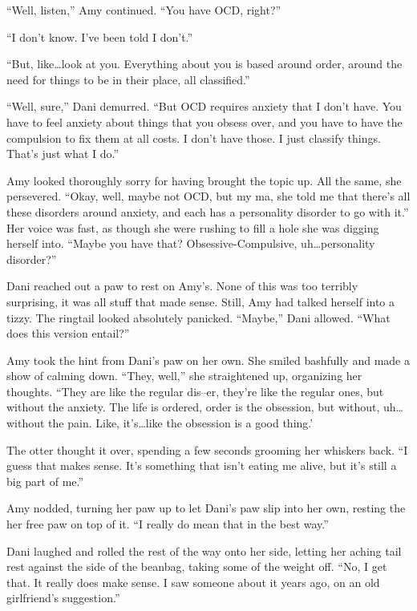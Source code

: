 ``Well, listen,'' Amy continued. ``You have OCD, right?''

``I don't know. I've been told I don't.''

``But, like\ldots{}look at you. Everything about you is based around order, around the need for things to be in their place, all classified.''

``Well, sure,'' Dani demurred. ``But OCD requires anxiety that I don't have. You have to feel anxiety about things that you obsess over, and you have to have the compulsion to fix them at all costs. I don't have those. I just classify things. That's just what I do.''\newpage

Amy looked thoroughly sorry for having brought the topic up. All the same, she persevered. ``Okay, well, maybe not OCD, but my ma, she told me that there's all these disorders around anxiety, and each has a personality disorder to go with it.'' Her voice was fast, as though she were rushing to fill a hole she was digging herself into. ``Maybe you have that? Obsessive-Compulsive, uh\ldots{}personality disorder?''

Dani reached out a paw to rest on Amy's. None of this was too terribly surprising, it was all stuff that made sense. Still, Amy had talked herself into a tizzy. The ringtail looked absolutely panicked. ``Maybe,'' Dani allowed. ``What does this version entail?''

Amy took the hint from Dani's paw on her own. She smiled bashfully and made a show of calming down. ``They, well,'' she straightened up, organizing her thoughts. ``They are like the regular dis--er, they're like the regular ones, but without the anxiety. The life is ordered, order is the obsession, but without, uh\ldots{}without the pain. Like, it's\ldots{}like the obsession is a good thing.'

The otter thought it over, spending a few seconds grooming her whiskers back. ``I guess that makes sense. It's something that isn't eating me alive, but it's still a big part of me.''

Amy nodded, turning her paw up to let Dani's paw slip into her own, resting the her free paw on top of it. ``I really do mean that in the best way.''

Dani laughed and rolled the rest of the way onto her side, letting her aching tail rest against the side of the beanbag, taking some of the weight off. ``No, I get that. It really does make sense. I saw someone about it years ago, on an old girlfriend's suggestion.''

